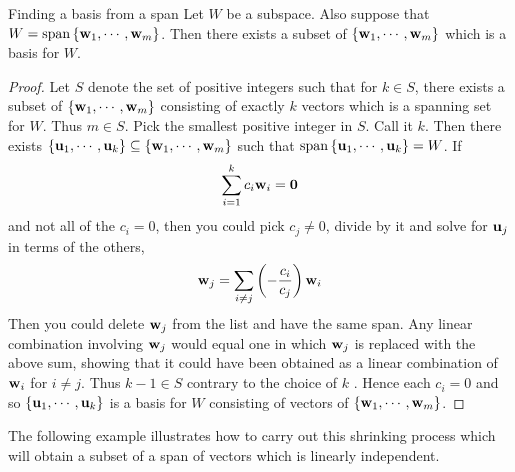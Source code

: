 \begin{theorem}{Finding a basis from a span}{}
  Let $W$ be a subspace. Also suppose that
  $W=\sspan\set{\vect{w} _{1},\cdots ,\vect{w}_{m}}$. Then there
  exists a subset of $\left\{ \mbox{\bf w}_{1},\cdots ,\mbox{\bf w}_{m}\right\} $ which
  is a basis for $W$.
\end{theorem}

\begin{proof}
  Let $S$ denote the set of positive integers such that for $ k\in S$,
  there exists a subset of $\left\{\mbox{\bf w}_{1},\cdots ,\mbox{\bf w}_{m}\right\} $
  consisting of exactly $k$ vectors which is a spanning set for
  $W$. Thus $m\in S$. Pick the smallest positive integer in $S$. Call
  it $k$. Then there exists
  $\left\{\mbox{\bf u}_{1},\cdots , \mbox{\bf u}_{k}\right\} \subseteq
  \left\{\mbox{\bf w}_{1},\cdots ,\mbox{\bf w} _{m}\right\} $ such that
  $\sspan\set{\vect{u}_{1},\cdots ,\vect{u} _{k}} =W$. If
  \begin{equation*}
    \sum_{i=1}^{k}c_{i}\mbox{\bf w}_{i}=\mbox{\bf 0}
  \end{equation*}
  and not all of the $c_{i}=0$, then you could pick $c_{j}\neq 0$,
  divide by it and solve for $\mbox{\bf u}_{j}$ in terms of the others,
  \begin{equation*}
    \mbox{\bf w}_{j}=\sum_{i\neq j}\left(-\frac{c_{i}}{c_{j}}\right) \mbox{\bf w}_{i}
  \end{equation*}
  Then you could delete $\mbox{\bf w}_{j}$ from the list and have the same
  span. Any linear combination involving $\mbox{\bf w}_{j}$ would equal
  one in which $\mbox{\bf w}_{j}$ is replaced with the above sum, showing
  that it could have been obtained as a linear combination of
  $\mbox{\bf w}_{i}$ for $i\neq j$. Thus $k-1\in S$ contrary to the choice
  of $k$ . Hence each $c_{i}=0$ and so
  $\left\{\mbox{\bf u}_{1},\cdots ,\mbox{\bf u} _{k}\right\} $ is a basis for $W$
  consisting of vectors of $\left\{\mbox{\bf w} _{1},\cdots ,\mbox{\bf w}_{m}\right\}$.
\end{proof}

The following example illustrates how to carry out this shrinking
process which will obtain a subset of a span of vectors which is
linearly independent.

